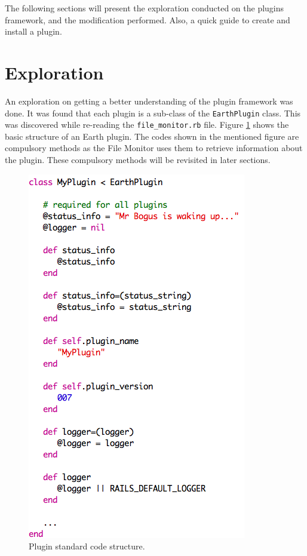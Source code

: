 \documentclass{article}
\begin{document}
\noindent
The following sections will present the exploration conducted on the plugins framework, and the modification performed. Also, a quick guide to create and install a plugin. \\


\section{Exploration} %
\label{sec:exploration}

An exploration on getting a better understanding of the plugin framework was done. It was found that each plugin is a sub-class of the \texttt{EarthPlugin} class. This was discovered while re-reading the \texttt{file\_monitor.rb} file. Figure \ref{fig:plugin} shows the basic structure of an Earth plugin. The codes shown in the mentioned figure are compulsory methods as the File Monitor uses them to retrieve information about the plugin. These compulsory methods will be revisited in later sections. 

\begin{figure}[ht]
    \centering
    \includegraphics[scale=0.5]{plugin_standard_codes.png}
    \caption{Plugin standard code structure.}
    \label{fig:plugin}
\end{figure}
\end{document}
